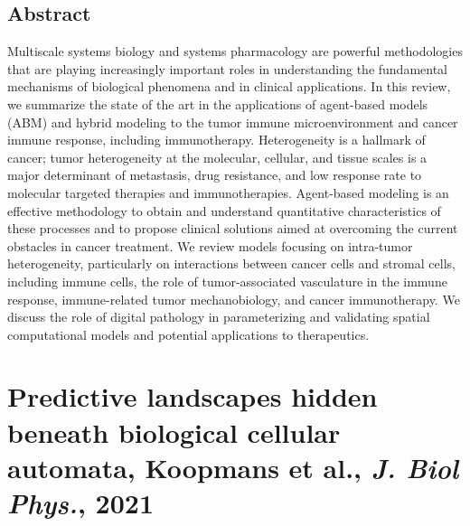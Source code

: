 \documentclass[11pt,a4paper]{article}
\begin{document}
\subsection*{Abstract}
Multiscale systems biology and systems pharmacology are powerful methodologies that are playing increasingly important roles in understanding the fundamental mechanisms of biological phenomena and in clinical applications. In this review, we summarize the state of the art in the applications of agent-based models (ABM) and hybrid modeling to the tumor immune microenvironment and cancer immune response, including immunotherapy. Heterogeneity is a hallmark of cancer; tumor heterogeneity at the molecular, cellular, and tissue scales is a major determinant of metastasis, drug resistance, and low response rate to molecular targeted therapies and immunotherapies. Agent-based modeling is an effective methodology to obtain and understand quantitative characteristics of these processes and to propose clinical solutions aimed at overcoming the current obstacles in cancer treatment. We review models focusing on intra-tumor heterogeneity, particularly on interactions between cancer cells and stromal cells, including immune cells, the role of tumor-associated vasculature in the immune response, immune-related tumor mechanobiology, and cancer immunotherapy. We discuss the role of digital pathology in parameterizing and validating spatial computational models and potential applications to therapeutics.

\section*{Predictive landscapes hidden beneath biological cellular automata, Koopmans et al., \textit{J. Biol Phys.}, 2021}
\end{document}
